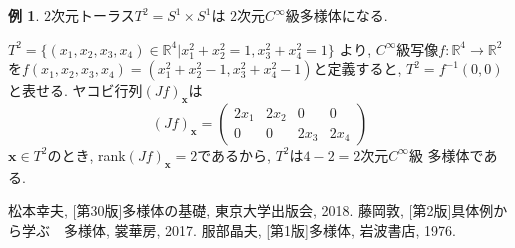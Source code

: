 \documentclass[twocolumn]{jarticle}
\theoremstyle{definition}
\newtheorem{example}[theorem]{例}
\begin{document}
\begin{example}
  $2$次元トーラス$T^2=S^1\times S^1$は
  $2$次元$C^\infty$級多様体になる. 

  $T^2=\{(x_1,x_2,x_3,x_4)\in \mathbb{R}^4|
  x_1^2+x_2^2=1, x_3^2+x_4^2=1\}$
  より, 
  $C^\infty$級写像$f:\mathbb{R}^4\to \mathbb{R}^2$
  を$f(x_1,x_2,x_3,x_4)=(x_1^2+x_2^2-1,
  x_3^2+x_4^2-1)$と定義すると, 
  $T^2=f^{-1}(0,0)$
  と表せる. ヤコビ行列$(Jf)_{\boldsymbol{x}}$は
  $$(Jf)_{\boldsymbol{x}}=
      \left(\begin{array}{cccc}
          2x_1&2x_2&0&0\\
          0&0&2x_3&2x_4
      \end{array}\right)$$
  $\boldsymbol{x}\in T^2$のとき, 
  rank$(Jf)_{\boldsymbol{x}}=2$であるから, 
  $T^2$は$4-2=2$次元$C^\infty$級
  多様体である. 
\end{example}
\begin{thebibliography}{99}
   松本幸夫, [第30版]多様体の基礎, 東京大学出版会, 2018.
   藤岡敦, [第2版]具体例から学ぶ　多様体, 裳華房, 2017.
   服部晶夫, [第1版]多様体, 岩波書店, 1976.
  \end{thebibliography}
\end{document}
